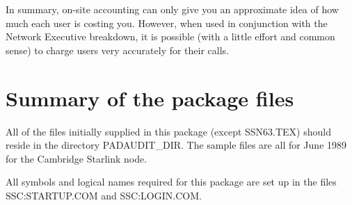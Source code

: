 In summary, on-site accounting can only give you an approximate idea
of how much each user is costing you. However, when used in conjunction
with the Network Executive breakdown, it is possible (with a little effort
and common sense) to charge users very accurately for their calls.


\section {Summary of the package files}

All of the files initially supplied in this package (except SSN63.TEX) should
reside in the directory PADAUDIT\_\/DIR. The sample files are all for June 1989
for the  Cambridge Starlink node. 

All symbols and logical names required for this package are set up in
the files SSC:STARTUP.COM and SSC:LOGIN.COM.

